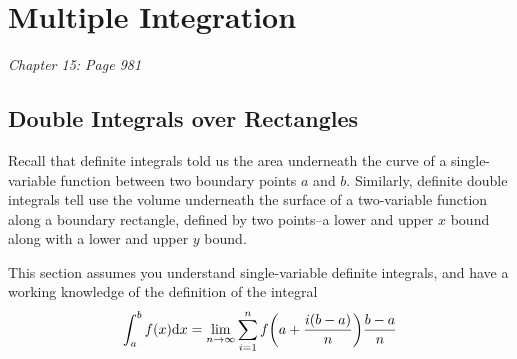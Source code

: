\section{Multiple Integration}
\it{Chapter 15: Page 981}
\subsection{Double Integrals over Rectangles}
Recall that definite integrals told us the area underneath the curve of a single-variable function between two boundary points \( a \) and \( b \). Similarly, definite double integrals tell use the volume underneath the surface of a two-variable function along a boundary rectangle, defined by two points--a lower and upper \( x \) bound along with a lower and upper \( y \) bound.\par
This section assumes you understand single-variable definite integrals, and have a working knowledge of the definition of the integral
\[ \int_a^bf(x)\dd x = \lim_{n\to\infty}\sum_{i=1}^nf\pqty{a+\frac{i(b-a)}{n}}\frac{b-a}{n}\]
